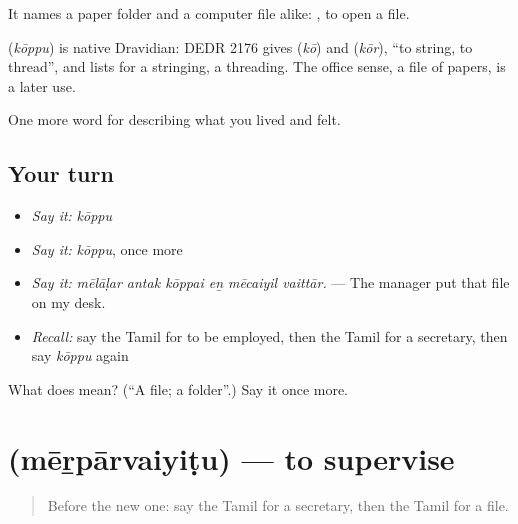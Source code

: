 It names a paper folder and a computer file alike:  , to open a file.

\begin{cousinweb}
\textbf{} (\emph{kōppu}) is native Dravidian: DEDR 2176 gives  (\emph{kō}) and  (\emph{kōr}), \textquotedblleft{}to string, to thread\textquotedblright{}, and lists  for a stringing, a threading. The office sense, a file of papers, is a later use.
\end{cousinweb}

\begin{grammarlens}[title={What you've built}]
One more word for describing what you lived and felt.
\end{grammarlens}

\subsection*{Your turn}
\begin{itemize}
\raggedright
  \item \emph{Say it:} \emph{kōppu}
  \item \emph{Say it:} \emph{kōppu}, once more
  \item \emph{Say it:} \emph{mēlāḷar antak kōppai eṉ mēcaiyil vaittār.} — The manager put that file on my desk.
  \item \emph{Recall:} say the Tamil for to be employed, then the Tamil for a secretary, then say \emph{kōppu} again
\end{itemize}

\begin{tcolorbox}[breakable,colback=teal!4,colframe=teal!35!black,title={Before you move on}]
What does  mean? (\textquotedblleft{}A file; a folder\textquotedblright{}.) Say it once more.
\end{tcolorbox}
\section[\texorpdfstring{\ta{மேற்பார்வையிடு} (mēṟpārvaiyiṭu)}{மேற்பார்வையிடு (mēṟpārvaiyiṭu)}]{ (mēṟpārvaiyiṭu) — to supervise}

\label{lesson:TA-C507-merparvaiyitu}



\begin{quote}
Before the new one: say the Tamil for a secretary, then the Tamil for a file.
\end{quote}

